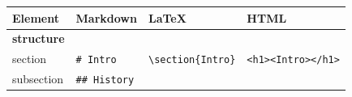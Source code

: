 \documentclass[10pt,fleq]{wlpeerj}
\begin{document}
\begin{longtable}[]{@{}llll@{}}
\toprule
\begin{minipage}[b]{0.24\columnwidth}\raggedright\strut
Element\strut
\end{minipage}
&
\begin{minipage}[b]{0.15\columnwidth}\raggedright\strut
Markdown\strut
\end{minipage}
&
\begin{minipage}[b]{0.26\columnwidth}\raggedright\strut
LaTeX\strut
\end{minipage}
&
\begin{minipage}[b]{0.24\columnwidth}\raggedright\strut
HTML\strut
\end{minipage}\tabularnewline
\midrule
\endhead
\begin{minipage}[t]{0.24\columnwidth}\raggedright\strut
\textbf{structure}\strut
\end{minipage}
&
\begin{minipage}[t]{0.15\columnwidth}\raggedright\strut
\strut
\end{minipage}
&
\begin{minipage}[t]{0.26\columnwidth}\raggedright\strut
\strut
\end{minipage}
&
\begin{minipage}[t]{0.24\columnwidth}\raggedright\strut
\strut
\end{minipage}\tabularnewline
\begin{minipage}[t]{0.24\columnwidth}\raggedright\strut
section\strut
\end{minipage}
&
\begin{minipage}[t]{0.15\columnwidth}\raggedright\strut
\texttt{\#\ Intro}\strut
\end{minipage}
&
\begin{minipage}[t]{0.26\columnwidth}\raggedright\strut
\texttt{\textbackslash{}section\{Intro\}}\strut
\end{minipage}
&
\begin{minipage}[t]{0.24\columnwidth}\raggedright\strut
\texttt{\textless{}h1\textgreater{}\textless{}Intro\textgreater{}\textless{}/h1\textgreater{}}\strut
\end{minipage}\tabularnewline
\begin{minipage}[t]{0.24\columnwidth}\raggedright\strut
subsection\strut
\end{minipage}
&
\begin{minipage}[t]{0.15\columnwidth}\raggedright\strut
\texttt{\#\#\ History}\strut
\end{minipage}

\end{longtable}
\end{document}

